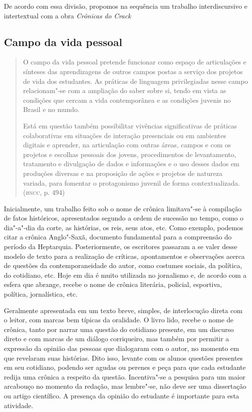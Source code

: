 \documentclass[11pt]{extarticle}
\begin{document}
De acordo com essa divisão, propomos na sequência um trabalho
interdiscursivo e intertextual com a obra \emph{Crônicas do Crack}

\subsection{Campo da vida pessoal}

\begin{quote}
O campo da vida pessoal pretende funcionar como espaço de articulações
e sínteses das aprendizagens de outros campos postas a serviço dos
projetos de vida dos estudantes. As práticas de linguagem privilegiadas
nesse campo relacionam"-se com a ampliação do saber sobre si, tendo em
vista as condições que cercam a vida contemporânea e as condições
juvenis no Brasil e no mundo.

Está em questão também possibilitar vivências significativas de práticas
colaborativas em situações de interação presenciais ou em ambientes
digitais e aprender, na articulação com outras áreas, campos e com os
projetos e escolhas pessoais dos jovens, procedimentos de levantamento,
tratamento e divulgação de dados e informações e o uso desses dados em
produções diversas e na proposição de ações e projetos de natureza
variada, para fomentar o protagonismo juvenil de forma
contextualizada. (\textsc{bncc}, p. 494)
\end{quote}

Inicialmente, um trabalho feito sob o nome de crônica limitava"-se à
compilação de fatos históricos, apresentados segundo a ordem de
sucessão no tempo, como o dia"-a"-dia da corte, as histórias, os reis,
seus atos, etc. Como exemplo, podemos citar a crônica Anglo"-Saxã,
documento fundamental para a compreensão do período da Heptarquia.
Posteriormente, os escritores passaram a se valer desse modelo de
texto para a realização de críticas, apontamentos e observações acerca
de questões da contemporaneidade do autor, como costumes sociais, da
política, do cotidiano, etc. Hoje em dia é muito utilizada no
jornalismo e, de acordo com a esfera que abrange, recebe o nome de
crônica literária, policial, esportiva, política, jornalística, etc.

Geralmente apresentada em um texto breve, simples, de interlocução
direta com o leitor, com marcas bem típicas da oralidade. O livro lido,
recebe o nome de crônica, tanto por narrar uma questão do cotidiano
presente, em um discurso direto e com marcas de um diálogo corriqueiro,
mas também por permitir a expressão da opinião das pessoas que
dialogaram com o autor, no momento em que revelaram suas histórias. Dito
isso, levante com os alunos questões presentes em seu cotidiano, podendo
ser agudas ou perenes e peça para que cada estudante redija uma crônica
a respeito da questão. Incentiva"-se a pesquisa para um maior arcabouço
no momento da redação, mas lembre"-se, não deve ser uma dissertação ou
artigo científico. A presença da opinião do estudante é importante para
esta atividade.
\end{document}
